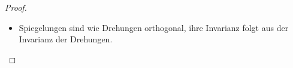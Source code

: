 \begin{lemma}
\begin{proof}
\begin{enumerate}
\begin{itemize}
\begin{align*}
          D_\theta \circ c(t) &= \begin{pmatrix}
            \cos\theta & -\sin\theta \\
            \sin\theta & \cos\theta
          \end{pmatrix}c(t) \\ 
           &= (\cos\theta x(t) - \sin\theta y(t), \sin\theta x(t) + \cos\theta y(t))
        \end{align*}
        die um Winkel $ \theta $ gedrehte Kurve. \\
        Da $ D_\theta $ eine orthogonale Abbildung ist, folgt
        \begin{equation*}
          (D_\theta \circ c(t))' = D_\theta * c'(t)
        \end{equation*}
        und damit
        \begin{equation*}
          \left\Vert (D_\theta \circ c(t))' \right\Vert = \left\Vert D_\theta * c' \right\Vert \overset{\text{orth.}}{=} \left\Vert c' \right\Vert
        \end{equation*}
        und damit gilt das Lemma für Drehungen. \qed
        \item Spiegelungen sind wie Drehungen orthogonal, ihre Invarianz folgt aus der Invarianz der Drehungen.
      \end{itemize}
    \end{enumerate}
  \end{proof}
\end{lemma}

